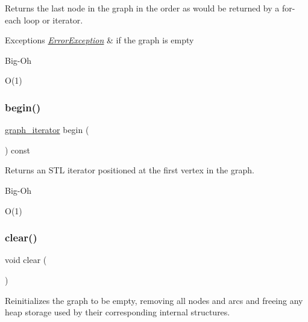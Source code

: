 Returns the last node in the graph in the order as would be returned by a for-\/each loop or iterator. 


\begin{DoxyExceptions}{Exceptions}
{\em \mbox{\hyperlink{classErrorException}{Error\+Exception}}} & if the graph is empty \\
\hline
\end{DoxyExceptions}
\begin{DoxyRefDesc}{Big-\/\+Oh}
\item[\mbox{\hyperlink{BigOh__BigOh000048}{Big-\/\+Oh}}]O(1) \end{DoxyRefDesc}
\mbox{\label{classGraph_aea3a8950c46f4ac913207201b685e715}} 
\subsubsection{\texorpdfstring{begin()}{begin()}}
{\footnotesize\ttfamily \mbox{\hyperlink{classGraph_a695969c31e87f9e8319d74e5ca39024b}{graph\+\_\+iterator}} begin (\begin{DoxyParamCaption}{ }\end{DoxyParamCaption}) const\hspace{0.3cm}{\ttfamily [inline]}}



Returns an S\+TL iterator positioned at the first vertex in the graph. 

\begin{DoxyRefDesc}{Big-\/\+Oh}
\item[\mbox{\hyperlink{BigOh__BigOh000091}{Big-\/\+Oh}}]O(1) \end{DoxyRefDesc}
\mbox{\label{classGraph_ac8bb3912a3ce86b15842e79d0b421204}} 
\subsubsection{\texorpdfstring{clear()}{clear()}}
{\footnotesize\ttfamily void clear (\begin{DoxyParamCaption}{ }\end{DoxyParamCaption})}



Reinitializes the graph to be empty, removing all nodes and arcs and freeing any heap storage used by their corresponding internal structures. 

